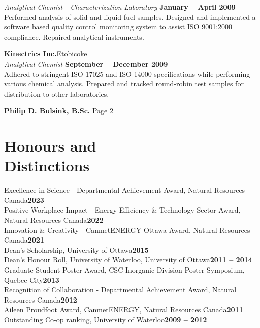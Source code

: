 \documentclass[margin,line]{resume}
\begin{document}
\begin{resume}
    \textsl{Analytical Chemist - Characterization Laboratory} \hfill \textbf{January -- April 2009}\\
    Performed analysis of solid and liquid fuel samples.
    Designed and implemented a software based quality control monitoring system to assist ISO 9001:2000 compliance.
    Repaired analytical instruments.

    \textbf{Kinectrics Inc.}\hfill Etobicoke\\\vspace{1mm}%
    \textsl{Analytical Chemist} \hfill \textbf{September -- December 2009}\\
    Adhered to stringent ISO 17025 and ISO 14000 specifications while performing various chemical analysis.
    Prepared and tracked round-robin test samples for distribution to other laboratories.

\newpage
	\textbf{Philip D. Bulsink, B.Sc.} \hspace{279pt} Page 2 \\
	\vspace{-4mm}
    \section{\mysidestyle Honours and\\Distinctions} 

    Excellence in Science - Departmental Achievement Award,  Natural Resources Canada\hfill\textbf{2023}\vspace{1mm}\\%
    Positive Workplace Impact - Energy Efficiency \& Technology Sector Award, Natural Resources Canada\hfill\textbf{2022}\vspace{1mm}\\%
    Innovation \& Creativity - CanmetENERGY-Ottawa Award, Natural Resources Canada\hfill\textbf{2021}\vspace{1mm}\\%
    Dean's Scholarship, University of Ottawa\hfill\textbf{2015}\vspace{1mm}\\%
    Dean's Honour Roll, University of Waterloo, University of Ottawa\hfill\textbf{2011 -- 2014}\vspace{1mm}\\%
    Graduate Student Poster Award, CSC Inorganic Division Poster Symposium, Quebec City\hfill\textbf{2013}\vspace{1mm}\\%
    Recognition of Collaboration - Departmental Achievement Award, Natural Resources Canada\hfill\textbf{2012}\vspace{1mm}\\%
    Aileen Proudfoot Award, CanmetENERGY, Natural Resources Canada\hfill\textbf{2011}\vspace{1mm}\\%
    Outstanding Co-op ranking, University of Waterloo\hfill\textbf{2009 -- 2012}\vspace{1mm}%


\end{resume}
\end{document}
